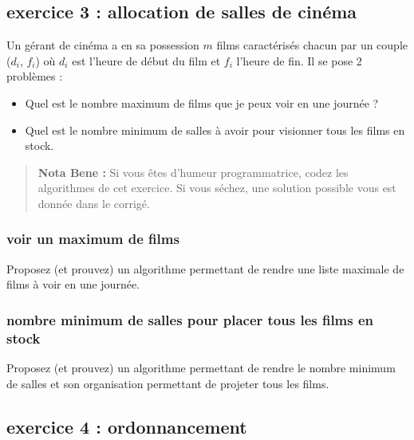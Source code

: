 \documentclass[
]{article}
\providecommand{\tightlist}{%
  \setlength{\itemsep}{0pt}\setlength{\parskip}{0pt}}
\begin{document}
\hypertarget{exercice-3-allocation-de-salles-de-cinuxe9ma}{%
\subsection{exercice 3 : allocation de salles de
cinéma}\label{exercice-3-allocation-de-salles-de-cinuxe9ma}}

Un gérant de cinéma a en sa possession \(m\) films caractérisés chacun
par un couple (\(d_i\), \(f_i\)) où \(d_i\) est l'heure de début du film
et \(f_i\) l'heure de fin. Il se pose 2 problèmes :

\begin{itemize}
\tightlist
\item
  Quel est le nombre maximum de films que je peux voir en une journée ?
\item
  Quel est le nombre minimum de salles à avoir pour visionner tous les
  films en stock.
\end{itemize}

\begin{quote}
\textbf{Nota Bene :} Si vous êtes d'humeur programmatrice, codez les
algorithmes de cet exercice. Si vous séchez, une solution possible vous
est donnée dans le corrigé.
\end{quote}

\hypertarget{voir-un-maximum-de-films}{%
\subsubsection{voir un maximum de
films}\label{voir-un-maximum-de-films}}

Proposez (et prouvez) un algorithme permettant de rendre une liste
maximale de films à voir en une journée.

\hypertarget{nombre-minimum-de-salles-pour-placer-tous-les-films-en-stock}{%
\subsubsection{nombre minimum de salles pour placer tous les films en
stock}\label{nombre-minimum-de-salles-pour-placer-tous-les-films-en-stock}}

Proposez (et prouvez) un algorithme permettant de rendre le nombre
minimum de salles et son organisation permettant de projeter tous les
films.

\hypertarget{exercice-4-ordonnancement}{%
\subsection{exercice 4 :
ordonnancement}\label{exercice-4-ordonnancement}}
\end{document}
